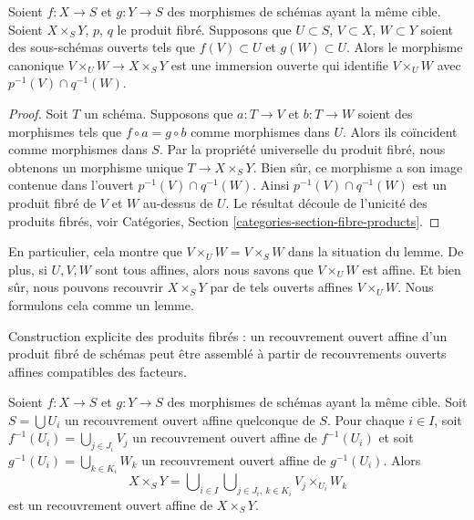 \begin{lemma}
\label{lemma-open-fibre-product}
Soient  $f : X \to S$  et  $g : Y \to S$  des morphismes de schémas ayant la même cible.
Soient  $X \times_S Y$,  $p$,  $q$  le produit fibré. Supposons que
 $U \subset S$,  $V \subset X$,  $W \subset Y$  soient des sous-schémas ouverts tels que
 $f(V) \subset U$  et  $g(W) \subset U$. Alors le morphisme canonique  $V \times_U W \to X \times_S Y$  est une
immersion ouverte qui identifie  $V \times_U W$  avec  $p^{-1}(V) \cap q^{-1}(W)$.
\end{lemma}

\begin{proof}
Soit  $T$  un schéma. Supposons que  $a : T \to V$  et  $b : T \to W$  soient des
morphismes tels que  $f \circ a = g \circ b$  comme morphismes dans  $U$. Alors ils
coïncident comme morphismes dans  $S$. Par la propriété universelle du
produit fibré, nous obtenons un morphisme unique  $T \to X \times_S Y$. Bien sûr, ce
morphisme a son image contenue dans l'ouvert  $p^{-1}(V) \cap q^{-1}(W)$. Ainsi  $p^{-1}(V) \cap q^{-1}(W)$  est
un produit fibré de  $V$  et  $W$  au-dessus de  $U$. Le
résultat découle de l'unicité des produits fibrés, voir Catégories, Section
 \ref{categories-section-fibre-products}.
\end{proof}

\noindent
En particulier, cela montre que  $V \times_U W = V \times_S W$  dans la situation du lemme.
De plus, si  $U, V, W$  sont tous affines, alors nous savons que  $V \times_U W$  est
affine. Et bien sûr, nous pouvons recouvrir  $X \times_S Y$  par de tels ouverts
affines  $V \times_U W$. Nous formulons cela comme un lemme.

\begin{lemma}
\label{lemma-affine-covering-fibre-product}
\begin{slogan}
Construction explicite des produits fibrés : un recouvrement ouvert affine d'un
produit fibré de schémas peut être assemblé à partir de recouvrements ouverts
affines compatibles des facteurs.
\end{slogan}
Soient  $f : X \to S$  et  $g : Y \to S$  des morphismes de schémas ayant la même cible.
Soit  $S = \bigcup U_i$  un recouvrement ouvert affine quelconque de  $S$. Pour
chaque  $i \in I$, soit  $f^{-1}(U_i) = \bigcup_{j \in J_i} V_j$  un recouvrement ouvert affine de
 $f^{-1}(U_i)$  et soit  $g^{-1}(U_i) = \bigcup_{k \in K_i} W_k$  un recouvrement ouvert affine de  $g^{-1}(U_i)$.
Alors
$$
X \times_S Y =
\bigcup\nolimits_{i \in I}
\bigcup\nolimits_{j \in J_i, \ k \in K_i}
V_j \times_{U_i} W_k
$$
est un recouvrement ouvert affine de  $X \times_S Y$.
\end{lemma}

